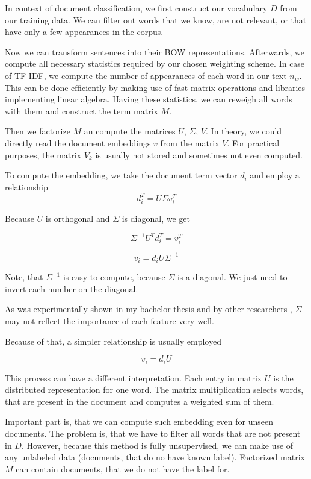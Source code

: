     In context of document classification, we first construct our vocabulary $D$ from our training data. 
    We can filter out words that we know, are not relevant, or that have only a few appearances in the corpus.
    
    Now we can transform sentences into their BOW representations.
    Afterwards, we compute all necessary statistics required by our chosen weighting scheme.
    In case of TF-IDF, we compute the number of appearances of each word in our text $n_w$. 
    This can be done efficiently by making use of fast matrix operations and libraries implementing linear algebra.
    Having these statistics, we can reweigh all words with them and construct the term matrix $M$.
    
    Then we factorize $M$ an compute the matrices $U$, $\Sigma$, $V$. 
    In theory, we could directly read the document embeddings $v$ from the matrix $V$.
    For practical purposes, the matrix $V_k$ is usually not stored and sometimes not even computed. 
    
    To compute the embedding, we take the document term vector $d_i$ and employ a relationship $$d_i^T = U \Sigma v_i^T$$
    
    Because $U$ is orthogonal and $\Sigma$ is diagonal, we get
    
    $$\Sigma^{-1} U^T d_i^T = v_i^T $$

    $$v_i = d_i U \Sigma^{-1} $$
    
    Note, that $\Sigma^{-1}$ is easy to compute, because $\Sigma$ is a diagonal. 
    We just need to invert each number on the diagonal.  
    
    As was experimentally shown in my bachelor thesis \cite{macko2016} 
    and by other researchers \cite{levy2015improving}, $\Sigma$ may not reflect the importance of each feature very well.
    
    Because of that, a simpler relationship is usually employed
    
    $$v_i = d_i U $$
    
    This process can have a different interpretation.
    Each entry in matrix $U$ is the distributed representation for one word.
    The matrix multiplication selects words, that are present in the document and computes a weighted sum of them.
    
    Important part is, that we can compute such embedding even for unseen documents.
    The problem is, that we have to filter all words that are not present in $D$. 
    However, because this method is fully unsupervised, we can make use of any unlabeled data (documents, that do no have known label). 
    Factorized matrix $M$ can contain documents, that we do not have the label for.
    
